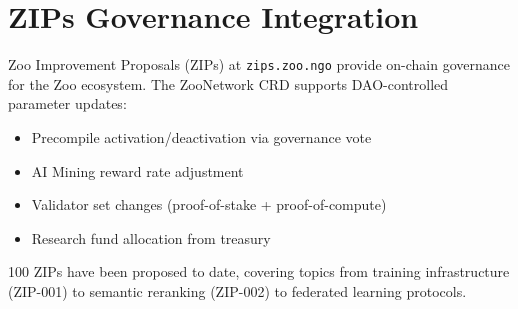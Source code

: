 \section{ZIPs Governance Integration}


Zoo Improvement Proposals (ZIPs) at \texttt{zips.zoo.ngo} provide on-chain governance for the Zoo ecosystem. The ZooNetwork CRD supports DAO-controlled parameter updates:

\begin{itemize}[nosep]
  \item Precompile activation/deactivation via governance vote
  \item AI Mining reward rate adjustment
  \item Validator set changes (proof-of-stake + proof-of-compute)
  \item Research fund allocation from treasury
\end{itemize}

100 ZIPs have been proposed to date, covering topics from training infrastructure (ZIP-001) to semantic reranking (ZIP-002) to federated learning protocols.

